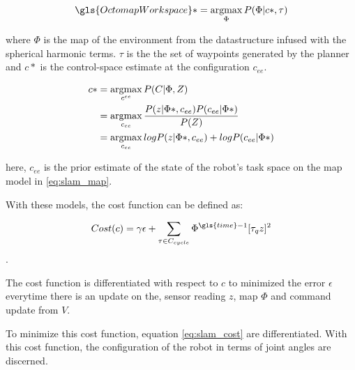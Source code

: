 
\begin{equation}\label{eq:slam_map}
  \gls{OctomapWorkspace}* = \argmax\limits_{\Phi} P(\Phi|c*,\tau)
\end{equation}

where $\Phi$ is the map of the environment from 
the datastructure infused with the spherical
harmonic terms. $\tau$ is the the set of
waypoints generated by the planner and $c*$ 
is the control-space estimate at the configuration $c_{ee}$.

\begin{equation}\label{eq:slam_localization}
  \begin{aligned}
    c* &= \operatorname*{argmax}\limits_{c^{ee}} P(C|\Phi,Z) \\
      &= \operatorname*{argmax}\limits_{c_{ee}} \frac{P(z|\Phi*,c_{ee})P(c_{ee}|\Phi*)}{P(Z)} \\
    &=  \operatorname*{argmax}\limits_{c_{ee}} log P(z|\Phi*,c_{ee}) + log P(c_{ee}|\Phi*)
  \end{aligned}
\end{equation}

here, $c_{ee}$ is the prior estimate of the state of
the robot's task space on the map model in
\ref{eq:slam_map}. 

With these models, the cost function can be defined as:

\begin{equation}\label{eq:slam_cost}
  Cost(c) = \gamma \epsilon +\sum_{\tau \in C_{cycle}} \Phi^{\gls{time}-1} [\tau_q z]^2
\end{equation}.

The cost function is differentiated with respect to $c$ to minimized the
error $\epsilon$ everytime there is an update on the, sensor reading $z$, map
$\Phi$ and command update from $V$. 

To minimize this cost function, equation \ref{eq:slam_cost} are differentiated.
With this cost function, the configuration of the robot in terms of joint angles are
discerned. 

